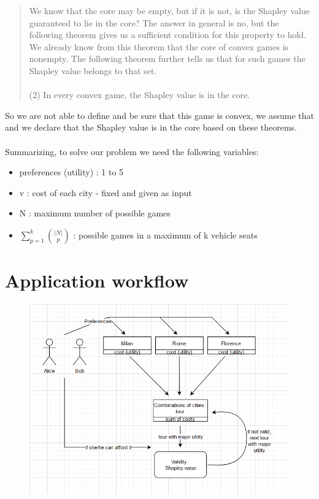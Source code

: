 \documentclass{article}
\begin{document}
{\begin{quote}
    We know that the core may be empty, but if it is not, is the Shapley value guaranteed to lie in the core? The answer in general is no, but the following theorem gives us a sufficient condition for this property to hold. We already know from this theorem that the core of convex games is nonempty. The following theorem further tells us that for such games the Shapley value belongs to that set.\\\\
    (2) In every convex game, the Shapley value is in the core.
\end{quote}
So we are not able to define and be sure that this game is convex, we assume that and we declare that the Shapley value is in the core based on these theorems.\\\\
Summarizing, to solve our problem we need the following variables:
\begin{itemize}
    \item preferences (utility) : 1 to 5
    \item v : cost of each city - fixed and given as input
    \item N : maximum number of possible games
    \item  $\displaystyle\sum_{p=1}^k \binom {{\vert N \vert}} {p}$ : possible games in a maximum of k vehicle seats
\end{itemize}
}
\section{Application workflow}
\begin{figure}[htbp!]
\centering
  \includegraphics[width=\linewidth]{workflow.png}
  \label{fig:workflow}
\end{figure}
\end{document}
